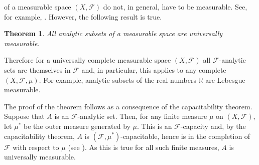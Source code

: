 \documentclass[12pt]{article}
\newtheorem*{theorem*}{Theorem}
\begin{document}

 of a measurable space $(X,\mathcal{F})$ do not, in general, have to be measurable. See, for example, . However, the following result is true.

\begin{theorem*}
All analytic subsets of a measurable space are universally measurable.
\end{theorem*}

Therefore for a universally complete measurable space $(X,\mathcal{F})$ all $\mathcal{F}$-analytic sets are themselves in $\mathcal{F}$ and, in particular, this applies to any complete  $(X,\mathcal{F},\mu)$. For example, analytic subsets of the real numbers $\mathbb{R}$ are Lebesgue measurable.

The proof of the theorem follows as a consequence of the capacitability theorem.
Suppose that $A$ is an $\mathcal{F}$-analytic set. Then, for any finite measure $\mu$ on $(X,\mathcal{F})$, let $\mu^*$ be the outer measure generated by $\mu$. This is an $\mathcal{F}$-capacity and, by the capacitability theorem, $A$ is $(\mathcal{F},\mu^*)$-capacitable, hence is in the completion of $\mathcal{F}$ with respect to $\mu$ (see ). As this is true for all such finite measures, $A$ is universally measurable.

\end{document}
